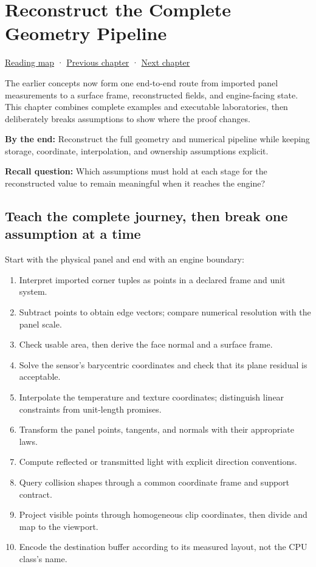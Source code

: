 \hypertarget{02-foundations-ii-ch038}{}
\chapter{Reconstruct the Complete Geometry Pipeline}\label{02-foundations-ii-ch038-reconstruct-the-complete-geometry-pipeline}

\hyperref[volume-reading-map]{Reading map} · \hyperref[02-foundations-ii-ch037-camera-contracts-and-transform-chain-debugging]{Previous chapter} · \hyperref[02-foundations-ii-ch039-research-navigation-and-source-boundaries]{Next chapter}

The earlier concepts now form one end-to-end route from imported panel measurements to a surface frame, reconstructed fields, and engine-facing state. This chapter combines complete examples and executable laboratories, then deliberately breaks assumptions to show where the proof changes.

\textbf{By the end:} Reconstruct the full geometry and numerical pipeline while keeping storage, coordinate, interpolation, and ownership assumptions explicit.

\textbf{Recall question:} Which assumptions must hold at each stage for the reconstructed value to remain meaningful when it reaches the engine?

\section{Teach the complete journey, then break one assumption at a time}\label{02-foundations-ii-ch038-teach-the-complete-journey-then-break-one-assumption-at-a-time}

Start with the physical panel and end with an engine boundary:

\begin{enumerate}
\def\labelenumi{\arabic{enumi}.}
\tightlist
\item
  Interpret imported corner tuples as points in a declared frame and unit system.
\item
  Subtract points to obtain edge vectors; compare numerical resolution with the panel scale.
\item
  Check usable area, then derive the face normal and a surface frame.
\item
  Solve the sensor's barycentric coordinates and check that its plane residual is acceptable.
\item
  Interpolate the temperature and texture coordinates; distinguish linear constraints from unit-length promises.
\item
  Transform the panel points, tangents, and normals with their appropriate laws.
\item
  Compute reflected or transmitted light with explicit direction conventions.
\item
  Query collision shapes through a common coordinate frame and support contract.
\item
  Project visible points through homogeneous clip coordinates, then divide and map to the viewport.
\item
  Encode the destination buffer according to its measured layout, not the CPU class's name.
\end{enumerate}

